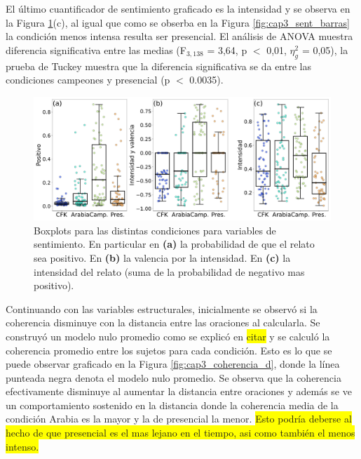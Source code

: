 El último cuantificador de sentimiento graficado es la intensidad y se observa en la Figura \ref{fig:cap3_vars_sentimiento}(c), al igual que como se obserba en la Figura \ref{fig:cap3_sent_barras} la condición menos intensa resulta ser presencial. El análisis de ANOVA muestra diferencia significativa entre las medias (F$_{3, 138}$ = 3,64, p $<$ 0,01, $\eta_g^2$ = 0,05), la prueba de Tuckey muestra que la diferencia significativa se da entre las condiciones campeones y presencial (p $<$ 0.0035).

\begin{figure}[H]
    \centering
    \includegraphics[width = 15cm]{figures/ch03/Herramientas NPL/Primer tiempo/Sin control/sentimiento_op2_boxplot.pdf} 
    \caption{Boxplots para las distintas condiciones para variables de sentimiento. En particular en \textbf{(a)} la probabilidad de que el relato sea positivo. En \textbf{(b)} la valencia por la intensidad. En \textbf{(c)} la intensidad del relato (suma de la probabilidad de negativo mas positivo).}
\label{fig:cap3_vars_sentimiento}
\end{figure}

Continuando con las variables estructurales, inicialmente se observó si la coherencia disminuye con la distancia entre las oraciones al calcularla. Se construyó un modelo nulo promedio como se explicó en \colorbox{yellow}{citar} y se calculó la coherencia promedio entre los sujetos para cada condición. Esto es lo que se puede observar graficado en la Figura \ref{fig:cap3_coherencia_d}, donde la línea punteada negra denota el modelo nulo promedio. Se observa que la coherencia efectivamente disminuye al aumentar la distancia entre oraciones y además se ve un comportamiento sostenido en la distancia donde la coherencia media de la condición Arabia es la mayor y la de presencial la menor. \colorbox{yellow}{Esto podría deberse al hecho de que presencial es el mas lejano en el tiempo, asi como también el menos intenso.}


